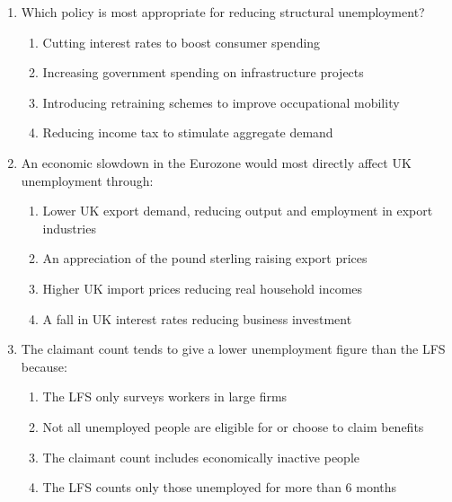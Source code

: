 \documentclass[12pt,a4paper]{article}
\begin{document}
\begin{enumerate}[leftmargin=*, label=\textbf{\arabic*.}]
    \item Which policy is most appropriate for reducing structural unemployment?
    \begin{enumerate}[label=(\Alph*), topsep=2pt]
        \item Cutting interest rates to boost consumer spending
        \item Increasing government spending on infrastructure projects
        \item Introducing retraining schemes to improve occupational mobility
        \item Reducing income tax to stimulate aggregate demand
    \end{enumerate}

    \vspace{0.4em}

    \item An economic slowdown in the Eurozone would most directly affect UK unemployment through:
    \begin{enumerate}[label=(\Alph*), topsep=2pt]
        \item Lower UK export demand, reducing output and employment in export industries
        \item An appreciation of the pound sterling raising export prices
        \item Higher UK import prices reducing real household incomes
        \item A fall in UK interest rates reducing business investment
    \end{enumerate}

    \vspace{0.4em}

    \item The claimant count tends to give a lower unemployment figure than the LFS because:
    \begin{enumerate}[label=(\Alph*), topsep=2pt]
        \item The LFS only surveys workers in large firms
        \item Not all unemployed people are eligible for or choose to claim benefits
        \item The claimant count includes economically inactive people
        \item The LFS counts only those unemployed for more than 6 months
    \end{enumerate}

\end{enumerate}
\end{document}
